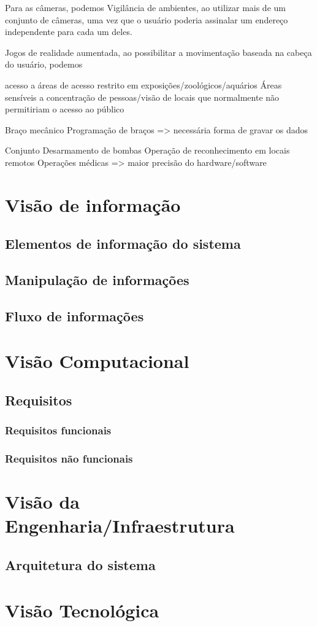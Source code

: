 	Para as câmeras, podemos 
	Vigilância de ambientes, 
	ao utilizar mais de um conjunto de câmeras, uma vez que o usuário poderia assinalar um endereço independente para cada um deles.
	
	Jogos de realidade aumentada, 
	ao possibilitar a movimentação baseada na cabeça do usuário, podemos 
	
	acesso a áreas de acesso restrito em exposições/zoológicos/aquários
	Áreas sensíveis a concentração de pessoas/visão de locais que normalmente não permitiriam o acesso ao público
	
	Braço mecânico
	Programação de braços => necessária forma de gravar os dados
	
	Conjunto
	Desarmamento de bombas
	Operação de reconhecimento em locais remotos
	Operações médicas => maior precisão do hardware/software
	
	\section{Visão de informação}\label{sec-info}
	\subsection{Elementos de informação do sistema}\label{subsec-elementos-info}
	\subsection{Manipulação de informações}\label{subsec-manip-info}
	\subsection{Fluxo de informações}\label{subsec-fluxo-info}
	\section{Visão Computacional}\label{sec-comp}
	\subsection{Requisitos}\label{subsec-req}
	\subsubsection{Requisitos funcionais}\label{subsec-req-func}
	\subsubsection{Requisitos não funcionais}\label{subsec-req-nfunc}
	\section{Visão da Engenharia/Infraestrutura}\label{sec-eng}
	\subsection{Arquitetura do sistema}\label{subsec-arq}
	\section{Visão Tecnológica}\label{sec-tec}
	
	